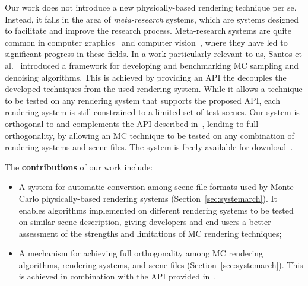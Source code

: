 Our work does not introduce a new physically-based rendering technique per se. Instead, it falls in the area of {\it meta-research} systems, which are systems designed to facilitate and improve the research process. Meta-research systems are quite common in computer graphics~\cite{Santos:2018:FBKSD, Ragan-Kelley2012,Buck2004,Mark2003} and computer vision~\cite{MiddleburyStereo, MiddleburyFlow, AlphaMatting, VideoMatting}, where they have led to significant progress in these fields. In a work particularly relevant to us,  Santos et al.~\cite{Santos:2018:FBKSD} introduced a framework for developing and benchmarking MC sampling and denoising algorithms. This is achieved by providing an API the decouples the developed techniques from the used rendering system. While it allows a technique to be tested on any rendering system that supports the proposed API, each rendering system is still constrained to a limited set of test scenes. Our system is orthogonal to and complements the API described in~\cite{Santos:2018:FBKSD}, lending to full orthogonality, by allowing an MC technique to be tested on any combination of rendering systems and scene files. The system is freely available for download~\cite{sceneConverter}.    

The {\bf contributions} of our work include:
\begin{itemize}
	\item A system for automatic conversion among scene file formats used by Monte Carlo physically-based rendering systems (Section~\ref{sec:systemarch}).
	It enables algorithms implemented on different rendering systems to be tested on similar scene description, giving developers and end users a better assessment of the strengths and limitations of MC rendering techniques;
	\item A mechanism for achieving full orthogonality among MC rendering algorithms, rendering systems, and scene files (Section~\ref{sec:systemarch}). This is achieved in combination with the API provided in~\cite{Santos:2018:FBKSD}. 
\end{itemize}

